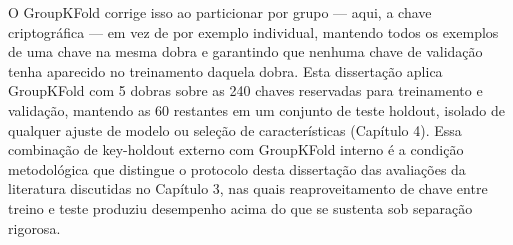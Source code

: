 O GroupKFold corrige isso ao particionar por grupo --- aqui, a chave criptográfica --- em vez de por exemplo individual, mantendo todos os exemplos de uma chave na mesma dobra e garantindo que nenhuma chave de validação tenha aparecido no treinamento daquela dobra. Esta dissertação aplica GroupKFold com 5 dobras sobre as 240 chaves reservadas para treinamento e validação, mantendo as 60 restantes em um conjunto de teste holdout, isolado de qualquer ajuste de modelo ou seleção de características (Capítulo 4). Essa combinação de key-holdout externo com GroupKFold interno é a condição metodológica que distingue o protocolo desta dissertação das avaliações da literatura discutidas no Capítulo 3, nas quais reaproveitamento de chave entre treino e teste produziu desempenho acima do que se sustenta sob separação rigorosa.


























